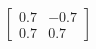 \documentclass[preview]{standalone}
\begin{document}
\begin{align*}
\begin{bmatrix} 0.7 & -0.7 \\ 0.7 & 0.7 \end{bmatrix}
\end{align*}
\end{document}

